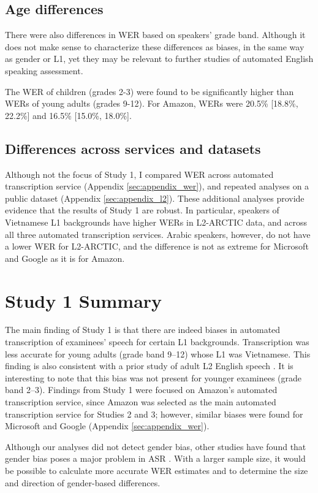 \documentclass [PhD] {uclathes}
\begin{document}
\subsection{Age differences}

There were also differences in WER based on speakers' grade band. Although it does not make sense to characterize these differences as biases, in the same way as gender or L1, yet they may be relevant to further studies of automated English speaking assessment.

The WER of children (grades 2-3) were found to be significantly higher than WERs of young adults (grades 9-12). For Amazon, WERs were 20.5\% [18.8\%, 22.2\%] and 16.5\% [15.0\%, 18.0\%].

\subsection{Differences across services and datasets}

Although not the focus of Study 1, I compared WER across automated transcription service (Appendix \ref{sec:appendix_wer}), and repeated analyses on a public dataset (Appendix \ref{sec:appendix_l2}). These additional analyses provide evidence that the results of Study 1 are robust. In particular, speakers of Vietnamese L1 backgrounds have higher WERs in L2-ARCTIC data, and across all three automated transcription services. Arabic speakers, however, do not have a lower WER for L2-ARCTIC, and the difference is not as extreme for Microsoft and Google as it is for Amazon. 

\section{Study 1 Summary}

The main finding of Study 1 is that there are indeed biases in automated transcription of examinees’ speech for certain L1 backgrounds. Transcription was less accurate for young adults (grade band 9–12) whose L1 was Vietnamese. This finding is also consistent with a prior study of adult L2 English speech \citep{chan2022training}. It is interesting to note that this bias was not present for younger examinees (grade band 2–3). Findings from Study 1 were focused on Amazon’s automated transcription service, since Amazon was selected as the main automated transcription service for Studies 2 and 3; however, similar biases were found for Microsoft and Google (Appendix \ref{sec:appendix_wer}). 

Although our analyses did not detect gender bias, other studies have found that gender bias poses a major problem in ASR \citep{hutiri2022}. With a larger sample size, it would be possible to calculate more accurate WER estimates and to determine the size and direction of gender-based differences. 
\end{document}
